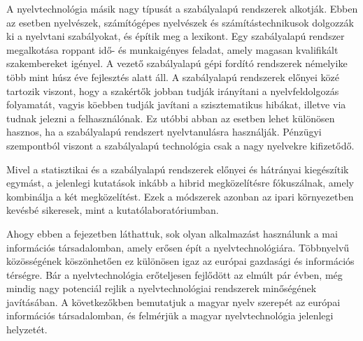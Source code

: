 \begin{multicols}{2}
A nyelvtechnológia másik nagy típusát a szabályalapú rendszerek alkotják. Ebben az esetben nyelvészek, számítógépes nyel\-vé\-szek és számítástechnikusok dolgozzák ki a nyelvtani szabályokat, és építik meg a lexikont. Egy szabályalapú rendszer megalkotása roppant idő- és munkaigényes feladat, amely magasan kvalifikált szak\-em\-be\-re\-ket igényel. A vezető szabályalapú gépi fordító rendszerek némelyike több mint húsz éve fejlesztés alatt áll. A szabályalapú rendszerek előnyei közé tartozik viszont, hogy a szakértők jobban tudják irányítani a nyelvfeldolgozás fo\-lya\-ma\-tát, va\-gyis köebben tudják javítani a szisztematikus hibákat, illetve via tudnak jelezni a felhasználónak. Ez utóbbi abban az esetben lehet különösen hasznos, ha a sza\-bály\-ala\-pú rendszert nyelvtanulásra használják. Pénzügyi szempontból viszont a sza\-bály\-ala\-pú technológia csak a nagy nyelvekre kifizetődő.

Mivel a statisztikai és a szabályalapú rendszerek előnyei és hátrányai kiegészítik egymást, a jelenlegi kutatások inkább a hibrid megközelítésre fókuszálnak, amely kombinálja a két megközelítést. Ezek a módszerek azonban az ipari környezetben kevésbé sikeresek, mint a kutatólaboratóriumban. 

Ahogy ebben a fejezetben láthattuk, sok olyan alkalmazást használunk a mai információs társadalomban, amely erősen épít a nyelvtechnológiára. Többnyelvű közösségének köszönhetően ez különösen igaz az európai gazdasági és információs térségre. Bár a nyelvtechnológia erőteljesen fejlődött az elmúlt pár évben, még mindig nagy potenciál rejlik a nyelvtechnológiai rendszerek minőségének ja\-ví\-tá\-sá\-ban. A következőkben bemutatjuk a magyar nyelv szerepét az európai információs társadalomban, és felmérjük a magyar nyelvtechnológia jelenlegi helyzetét.
\end{multicols}

\clearpage



